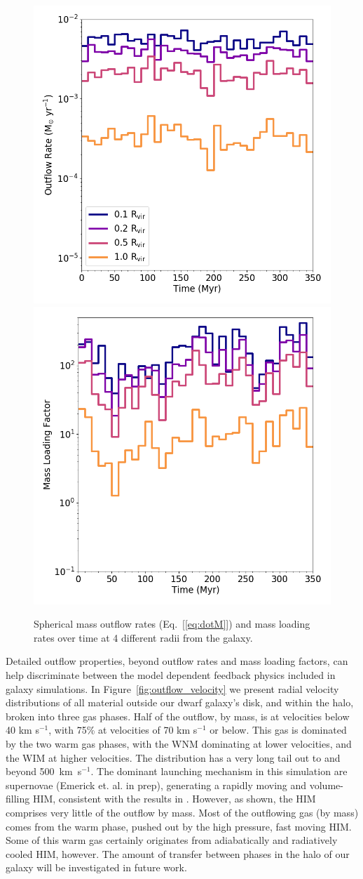 \documentclass[twocolumn]{aastex61}
\begin{document}
\begin{figure}
\centering
\includegraphics[width=0.45\linewidth]{total_mass_outflow}
\includegraphics[width=0.45\linewidth]{total_mass_loading}
\caption{Spherical mass outflow rates (Eq.~[\ref{eq:dotM}]) and mass loading rates over time at 4 different radii from the galaxy.}
\label{fig:mass_outflow}
\end{figure}

Detailed outflow properties, beyond outflow rates and mass loading factors, can help discriminate between the model dependent feedback physics included in galaxy simulations. In Figure~\ref{fig:outflow_velocity} we present radial velocity distributions of all material outside our dwarf galaxy's disk, and within the halo, broken into three gas phases. Half of the outflow, by mass, is at velocities below 40 km s$^{-1}$, with 75\% at velocities of 70 km s$^{-1}$ or below. This gas is dominated by the two warm gas phases, with the WNM dominating at lower velocities, and the WIM at higher velocities. The distribution has a very long tail out to and beyond 500~km~s$^{-1}$. The dominant launching mechanism in this simulation are supernovae (Emerick et. al. in prep), generating a rapidly moving and volume-filling HIM, consistent with the results in \citet{Hu2016,Hu2017}. However, as shown, the HIM comprises very little of the outflow by mass. Most of the outflowing gas (by mass) comes from the warm phase, pushed out by the high pressure, fast moving HIM. Some of this warm gas certainly originates from adiabatically and radiatively cooled HIM, however. The amount of transfer between phases in the halo of our galaxy will be investigated in future work.
\end{document}
